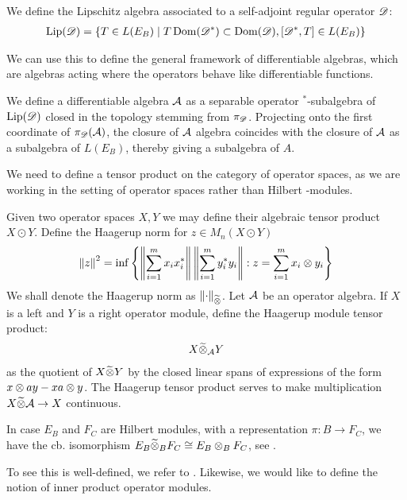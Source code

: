 \begin{definition}
We define the Lipschitz algebra associated to a self-adjoint regular operator $\mathscr{D}$:
\begin{align*}
	\operatorname{Lip}(\mathscr{D})=\{T\in L(E_B) \mid T\operatorname{Dom}(\mathscr{D}^*)\subset \operatorname{Dom}(\mathscr{D}), [\mathscr{D}^*,T]\in L(E_B)\}
\end{align*}
\end{definition}
We can use this to define the general framework of differentiable algebras, which are algebras acting where the operators behave like differentiable functions. 
\begin{definition}
We define a differentiable algebra $\mathcal{A}$ as a separable operator $^*$-subalgebra of $\operatorname{Lip}(\mathscr{D})$ closed in the topology stemming from $\pi_{\mathscr{D}}$. Projecting onto the first coordinate of $\pi_{\mathscr{D}}(\mathcal{A})$, the \Cstar closure of $\mathcal{A}$ algebra coincides with the closure of $\mathcal{A}$ as a subalgebra of $L(E_B)$, thereby giving a subalgebra of $A$. 
\end{definition}
We need to define a tensor product on the category of operator spaces,  as we are working in the setting of operator spaces rather than Hilbert \Cstar-modules. 
\begin{definition}
	Given two operator spaces $X,Y$ we may define their algebraic tensor product $X\odot Y$. Define the Haagerup norm for $z\in M_n(X\odot Y)$
	\begin{align*}
		\left \Vert z \right \Vert^2=\inf \left \{ \left \Vert \sum_{i=1}^m  x_ix_i^* \right \Vert \left \Vert \sum_{i=1}^m y_i^*y_i \right \Vert : z=\sum_{i=1}^m x_i\otimes y_i \right \}
	\end{align*}
	We shall denote the Haagerup norm as $\left \Vert \cdot \right \Vert_{\widetilde{\otimes}}$. Let $\mathcal{A}$ be an operator algebra. If $X$ is a left and $Y$ is a right operator module, define the Haagerup module tensor product:
	\begin{align*}
		X\widetilde{\otimes}_{\mathcal{A}} Y
	\end{align*}
	as the quotient of $X\widetilde{\otimes} Y$ by the closed linear spans of expressions of the form $x\otimes ay-xa\otimes y$. The Haagerup tensor product serves to make multiplication $X\widetilde{\otimes} \mathcal{A}\to X$ continuous. 
\end{definition}
\begin{remark}
	In case $E_B$ and $F_C$ are Hilbert modules, with a representation $\pi:B\to F_C$, we have the cb. isomorphism $E_B\widetilde{\otimes}_B F_C \cong E_B\otimes_B F_C$, see \cite{blecher}.
\end{remark}
To see this is well-defined, we refer to \cite{blecher}. 
Likewise, we would like to define the notion of inner product operator modules. 
